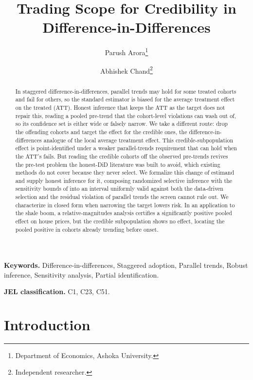 \documentclass[12pt]{article}
\title{\textbf{Trading Scope for Credibility in Difference-in-Differences}}
\author{Parush Arora\thanks{Department of Economics, Ashoka University.} \and Abhishek Chand\thanks{Independent researcher.}}
\date{}
\theoremstyle{remark}
\begin{document}
\maketitle

\begin{abstract}
\noindent In staggered difference-in-differences, parallel trends may hold for some treated cohorts and
fail for others, so the standard estimator is biased for the average treatment effect on the treated (ATT).
Honest inference that keeps the ATT as the target does not repair this, reading a pooled pre-trend that the
cohort-level violations can wash out of, so its confidence set is either wide or falsely narrow. We take a
different route: drop the offending cohorts and target the effect for the credible ones, the
difference-in-differences analogue of the local average treatment effect. This credible-subpopulation
effect is point-identified under a weaker parallel-trends requirement that can hold when the ATT's fails.
But reading the credible cohorts off the observed pre-trends revives the pre-test problem the honest-DiD
literature was built to avoid, which existing methods do not cover because they never select. We formalize
this change of estimand and supply honest inference for it, composing randomized selective inference
\citep{fithian2014, tiantaylor2018} with the sensitivity bounds of \citet{rambachan2023} into an interval
uniformly valid against both the data-driven selection and the residual violation of parallel trends the
screen cannot rule out. We characterize in closed form when narrowing the target lowers risk. In an application to the shale
boom, a relative-magnitudes analysis certifies a significantly positive pooled effect on house prices, but
the credible subpopulation shows no effect, locating the pooled positive in cohorts already trending before
onset.
\end{abstract}

\medskip
\noindent\textbf{Keywords. } Difference-in-differences, Staggered adoption, Parallel trends, Robust inference, Sensitivity analysis, Partial identification.

\smallskip
\noindent\textbf{JEL classification. } C1, C23, C51.

\newpage

\section{Introduction}
\end{document}
